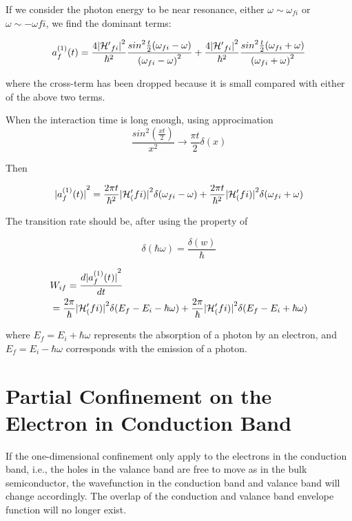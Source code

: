 If we consider the photon energy to be near resonance, either $\omega\sim\omega_{fi}$ or $\omega\sim-\omega{fi}$, we find the dominant terms:

\begin{equation}
  {a^{(1)}_{f}(t)}=\frac{4{|{\mathcal{H}^\prime}_{fi}|}^2}{\hbar^2}\frac{{sin}^2\frac{t}{2}(\omega_{fi}-\omega)}{{(\omega_{fi}-\omega)}^2} +\frac{4{|{\mathcal{H}^\prime}_{fi}|}^2}{\hbar^2}\frac{{sin}^2\frac{t}{2}(\omega_{fi}+\omega)}{{(\omega_{fi}+\omega)}^2}
\end{equation}

where the cross-term has been dropped because it is small compared with either of the above two terms.

When the interaction time is long enough, using approcimation
\begin{equation}
  \frac{{sin}^2(\frac{xt}{2})}{x^2}\rightarrow \frac{\pi{t}}{2}\delta(x)
\end{equation}

Then

\begin{equation}
  {|a^{(1)}_f(t)|}^2= \frac{2\pi{t}}{\hbar^2}{|\mathcal{H}^\prime_(fi)|}^2\delta(\omega_{fi}-\omega)+\frac{2\pi{t}}{\hbar^2}{|\mathcal{H}^\prime_(fi)|}^2\delta(\omega_{fi}+\omega)
\end{equation}

The transition rate should be, after using the property of

\begin{equation}
  \delta(\hbar\omega)=\frac{\delta(w)}{\hbar}
\end{equation}

\begin{eqnarray}
  & W_{if} = \frac{d{|a^{(1)}_f(t)|}^2}{dt} \\ 
  & = \frac{2\pi}{\hbar}{|\mathcal{H}^\prime_(fi)|}^2\delta(E_{f}-E_{i}-\hbar\omega)+\frac{2\pi}{\hbar}{|\mathcal{H}^\prime_(fi)|}^2\delta(E_{f}-E_{i}+\hbar\omega)
\end{eqnarray}

where $E_f = E_i+ \hbar\omega$ represents the absorption of a photon by an electron, and $E_f = E_i - \hbar\omega$ corresponds with the emission of a photon.

\chapter{Partial Confinement on the Electron in Conduction
Band}\label{partialconfinement}

If the one-dimensional confinement only apply to the electrons in the
conduction band, i.e., the holes in the valance band are free to move as
in the bulk semiconductor, the wavefunction in the conduction band and
valance band will change accordingly. The overlap of the conduction and
valance band envelope function will no longer exist.

